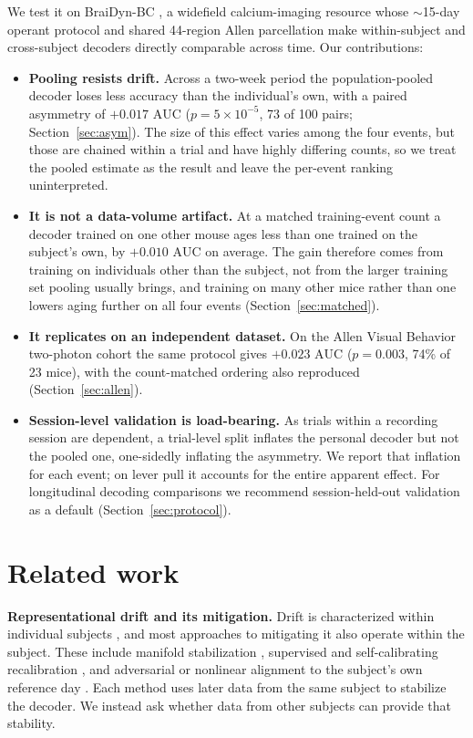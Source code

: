 \documentclass{article}
\newcommand{\auc}{\mathrm{AUC}}
\begin{document}
We test it on BraiDyn-BC \citep{kondo2025}, a widefield calcium-imaging resource whose $\sim$15-day
operant protocol and shared 44-region Allen parcellation make within-subject and cross-subject
decoders directly comparable across time. Our contributions:
\begin{itemize}\itemsep2pt
\item \textbf{Pooling resists drift.} Across a two-week period the population-pooled decoder loses
less accuracy than the individual's own, with a paired asymmetry of $+0.017$ $\auc$
($p = 5 \times 10^{-5}$, 73 of 100 pairs; Section~\ref{sec:asym}). The size of this effect varies
among the four events, but those are chained within a trial and have highly differing counts, so we
treat the pooled estimate as the result and leave the per-event ranking uninterpreted.
\item \textbf{It is not a data-volume artifact.} At a matched training-event count a decoder trained
on one other mouse ages less than one trained on the subject's own, by $+0.010$ $\auc$ on average.
The gain therefore comes from training on individuals other than the subject, not from the larger
training set pooling usually brings, and training on many other mice rather than one lowers aging
further on all four events (Section~\ref{sec:matched}).
\item \textbf{It replicates on an independent dataset.} On the Allen Visual Behavior two-photon
cohort the same protocol gives $+0.023$ $\auc$ ($p = 0.003$, 74\% of 23 mice), with the
count-matched ordering also reproduced (Section~\ref{sec:allen}).
\item \textbf{Session-level validation is load-bearing.} As trials within a recording session are
dependent, a trial-level split inflates the personal decoder but not the pooled one, one-sidedly
inflating the asymmetry. We report that inflation for each event; on lever pull it accounts for the
entire apparent effect. For longitudinal decoding comparisons we recommend session-held-out
validation as a default (Section~\ref{sec:protocol}).
\end{itemize}


\section{Related work}
\textbf{Representational drift and its mitigation.} Drift is characterized within individual
subjects \citep{rule2020,driscoll2017,schoonover2021,rule2019}, and most approaches to mitigating it
also operate within the subject. These include manifold stabilization \citep{degenhart2020},
supervised and self-calibrating recalibration \citep{jarosiewicz2015,wilson2025}, and adversarial or
nonlinear alignment to the subject's own reference day \citep{farshchian2019,karpowicz2025}. Each
method uses later data from the same subject to stabilize the decoder. We instead ask whether data
from other subjects can provide that stability.
\end{document}
